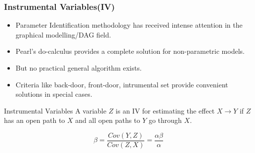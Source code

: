 \documentclass{beamer}
\begin{document}

\begin{frame}
	\frametitle{Instrumental Variables(IV)}
	\begin{itemize}
		\item Parameter Identification methodology has received intense attention in the graphical modelling/DAG field.
		\item Pearl's do-calculus provides a complete solution for non-parametric models.
		\item But no practical general algorithm exists.
		\item Criteria like back-door, front-door, intrumental set provide convenient solutions in special cases.
	\end{itemize}

	\begin{block}{Instrumental Variables}
		A variable $ Z $ is an IV for estimating the effect $ X \rightarrow Y $
		if $ Z $ has an open path to $ X $ and all open paths to $ Y $ go through
		$ X $.
	\end{block}
	\begin{figure}
		\centering
		\begin{subfigure}{0.5\linewidth}
		\end{subfigure}%
		\begin{subfigure}{0.5\linewidth}
			$$ \beta = \frac{Cov(Y, Z)}{Cov(Z, X)} = \frac{\alpha \beta}{\alpha}$$
		\end{subfigure}
	\end{figure}
\end{frame}
\end{document}
